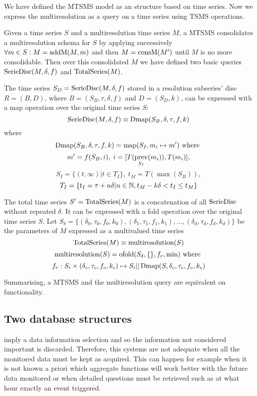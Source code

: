We have defined the MTSMS model as an structure based on time
series. Now we express the multiresolution as a query on a time series
using TSMS operations. 

Given a time series $S$ and a multiresolution time series $M$, a MTSMS
consolidates a multiresolution schema for $S$ by applying successively
$\forall m \in S: M=\operatorname{addM}(M,m)$ and then $M=\operatorname{consM}(M')$ until $M$ is
no more consolidable. Then over this consolidated $M$ we have defined
two basic queries $\operatorname{SerieDisc}(M,\delta,f)$ and $\operatorname{TotalSeries}(M)$.

The time series $S_D=\operatorname{SerieDisc}(M,\delta,f)$ stored in a resolution
subseries' disc $R=(B,D)$, where $B=(S_B,\tau,\delta,f)$ and
$D=(S_D,k)$, can be expressed with a map operation over the original
time series $S$:
\[
\operatorname{SerieDisc}(M,\delta,f) \equiv \operatorname{Dmap}(S_B,\delta,\tau,f,k)
\]
where
\[
\operatorname{Dmap}(S_B,\delta,\tau,f,k) = \operatorname*{map}(S_I, m_i\mapsto m') \text{ where }
\]
\[
 m' = f(S_B, i),\;  i = [T(\operatorname*{prev}_{S_I}(m_i)),T(m_i)],
\]
\[
 S_I = \{ (t,\infty) | t\in T_I  \},\;  t_M = T(\max(S_B)),
\]
\[
T_I = \{ t_I = \tau+n\delta | n\in\mathbb{N}, t_M - k\delta < t_I \leq t_M \}
\]

The total time series $S'=\operatorname{TotalSeries}(M)$ is a concatenation of all
$\operatorname{SerieDisc}$ without repeated $\delta$. It can be expressed with a
fold operation over the original time series $S$. Let $S_\delta = \{
(\delta_0,\tau_0,f_0,k_0), (\delta_1,\tau_1,f_1,k_1), \ldots,
(\delta_d,\tau_d,f_d,k_d)\}$ be the parameters of $M$ expressed as a
multivalued time series
\[
\operatorname{TotalSeries}(M) \equiv \operatorname{multiresolution}(S)
\]
\[
\operatorname{multiresolution}(S) = \operatorname*{ofold}(S_\delta,\{\},f_r,\min) \text{ where }
\]
\[
f_r: S_i \times (\delta_c,\tau_c,f_c,k_c) \mapsto S_i ||
\operatorname{Dmap}(S,\delta_c,\tau_c,f_c,k_c)
\]


Summarising, a MTSMS and the multiresolution query are equivalent on
functionality.



\subsection{Two database structures}

 imply a data information selection and so the information
not considered important is discarded.  Therefore, this systems are
not adequate when all the monitored data must be kept as
acquired. This can happen for example when it is not known a priori
which aggregate functions will work better with the future data
monitored or when detailed questions must be retrieved such as at what
hour exactly an event triggered. 

